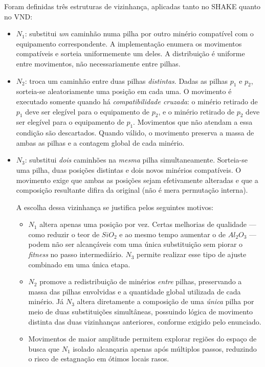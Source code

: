 \documentclass[12pt,a4paper]{article}
\begin{document}
Foram definidas três estruturas de vizinhança, aplicadas tanto no SHAKE
quanto no VND:

\begin{itemize}
    \item $N_1$: substitui \emph{um} caminhão numa pilha por outro
    minério compatível com o equipamento correspondente. A implementação enumera os movimentos compatíveis e sorteia uniformemente
    um deles. A distribuição é uniforme entre movimentos, não necessariamente
    entre pilhas.

    \item $N_2$: troca um caminhão entre duas pilhas \emph{distintas}.
    Dadas as pilhas $p_1$ e $p_2$, sorteia-se aleatoriamente uma posição
    em cada uma. O movimento é executado somente quando há
    \emph{compatibilidade cruzada}: o minério retirado de $p_1$ deve ser
    elegível para o equipamento de $p_2$, e o minério retirado de $p_2$
    deve ser elegível para o equipamento de $p_1$. Movimentos que não
    atendam a essa condição são descartados. Quando válido, o movimento
    preserva a massa de ambas as pilhas e a contagem global de cada minério.

    \item $N_3$: substitui \emph{dois} caminhões na \emph{mesma} pilha
    simultaneamente. Sorteia-se uma pilha, duas posições distintas e dois
    novos minérios compatíveis. O movimento exige que ambas as posições
    sejam efetivamente alteradas e que a composição resultante difira da
    original (não é mera permutação interna).

    A escolha dessa vizinhança se justifica pelos seguintes motivos:
    \begin{itemize}
        \item $N_1$ altera apenas uma posição por vez. Certas melhorias de
        qualidade --- como reduzir o teor de $SiO_2$ e ao mesmo tempo
        aumentar o de $Al_2O_3$ --- podem não ser alcançáveis com uma
        única substituição sem piorar o \textit{fitness} no passo
        intermediário. $N_3$ permite realizar esse tipo de ajuste combinado
        em uma única etapa.
        \item $N_2$ promove a redistribuição de minérios \emph{entre} pilhas,
        preservando a massa das pilhas envolvidas e a quantidade global
        utilizada de cada minério. Já $N_3$ altera diretamente a composição
        de uma \emph{única} pilha por meio de duas substituições simultâneas,
        possuindo lógica de movimento distinta das duas vizinhanças
        anteriores, conforme exigido pelo enunciado.
        \item Movimentos de maior amplitude permitem explorar regiões do
        espaço de busca que $N_1$ isolado alcançaria apenas após múltiplos
        passos, reduzindo o risco de estagnação em ótimos locais rasos.
    \end{itemize}
\end{itemize}
\end{document}
